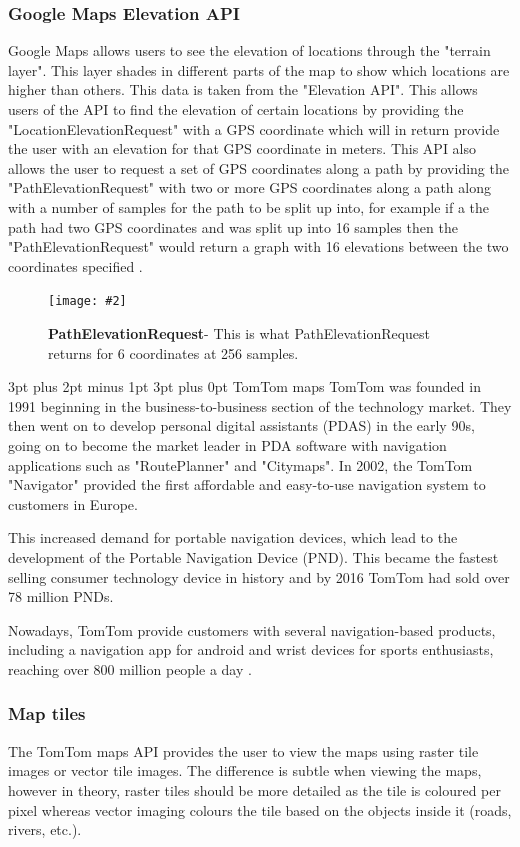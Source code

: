 \documentclass[12pt,a4paper]{article}
\makeatletter
\newcommand{\figuremacro}[5]{
    \begin{figure}[#1]
        \centering
        \texttt{[image: \#2]}
        \caption[#3]{\textbf{#3}#4}
        \label{fig:#2}
    \end{figure}
}
\renewcommand\subsection{\@startsection {subsection}{1}{2mm} %
                               {3pt plus 2pt minus 1pt} %
                               {3pt plus 0pt} %
                               {\normalfont\bfseries}}
\makeatother
\begin{document}
\subsubsection{Google Maps Elevation API}
Google Maps allows users to see the elevation of locations through the "terrain layer". This layer shades in different parts of the map to show which locations are higher than others. This data is taken from the "Elevation API". This allows users of the API to find the elevation of certain locations by providing the "LocationElevationRequest" with a GPS coordinate which will in return provide the user with an elevation for that GPS coordinate in meters. This API also allows the user to request a set of GPS coordinates along a path by providing the "PathElevationRequest" with two or more GPS coordinates along a path along with a number of samples for the path to be split up into, for example if a the path had two GPS coordinates and was split up into 16 samples then the "PathElevationRequest" would return a graph with 16 elevations between the two coordinates specified \cite{googleElevation}.

\figuremacro{h}{googleElevationPath}{PathElevationRequest}{- This is what PathElevationRequest returns for 6 coordinates at 256 samples.}{1.0} 

\subsection{TomTom maps}
TomTom was founded in 1991 beginning in the business-to-business section of the technology market. They then went on to develop personal digital assistants (PDAS) in the early 90s, going on to become the market leader in PDA software with navigation applications such as "RoutePlanner" and "Citymaps". In 2002, the TomTom "Navigator" provided the first affordable and easy-to-use navigation system to customers in Europe.

This increased demand for portable navigation devices, which lead to the development of the Portable Navigation Device (PND). This became the fastest selling consumer technology device in history and by 2016 TomTom had sold over 78 million PNDs.

Nowadays, TomTom provide customers with several navigation-based products, including a navigation app for android and wrist devices for sports enthusiasts, reaching over 800 million people a day \cite{TomTomHist}.

\subsubsection{Map tiles}
The TomTom maps API provides the user to view the maps using raster tile images or vector tile images. The difference is subtle when viewing the maps, however in theory, raster tiles should be more detailed as the tile is coloured per pixel whereas vector imaging colours the tile based on the objects inside it (roads, rivers, etc.).
\end{document}
